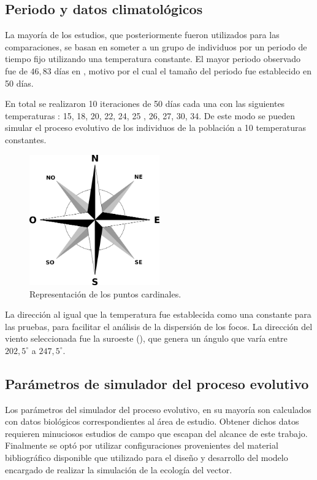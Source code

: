 \subsection{Periodo y datos climatológicos}
La mayoría de los estudios, que posteriormente fueron utilizados para las comparaciones, se basan
en someter a un grupo de individuos por un periodo de tiempo fijo utilizando una temperatura
constante. El mayor periodo observado fue de $46,83$ días en \cite{rueda1990temperature}, motivo
por el cual el tamaño del periodo fue establecido en 50 días.

En total se realizaron 10 iteraciones de 50 días cada una con las siguientes temperaturas :
15\textcelsius , 18\textcelsius , 20\textcelsius , 22\textcelsius , 24\textcelsius , 25\textcelsius
, 26\textcelsius , 27\textcelsius , 30\textcelsius , 34\textcelsius. De este modo se pueden simular
el proceso evolutivo de los individuos de la población a 10 temperaturas constantes.

\begin{figure}[!htpb]
\centering
\includegraphics[width=0.5\textwidth]{./capitulo-6/graphics/rosa-de-vientos.png}
\caption{\label{fig:puntos-cardinales}Representación de los puntos cardinales.}
\end{figure}

La dirección al igual que la temperatura fue establecida como una constante para las pruebas, para
facilitar el análisis de la dispersión de los focos. La dirección del viento seleccionada fue la
suroeste (), que genera un ángulo que varía entre $202,5^{\circ}$ a
$247,5^{\circ}$.

\subsection{Parámetros de simulador del proceso evolutivo}
Los parámetros del simulador del proceso evolutivo, en su mayoría son calculados con datos
biológicos correspondientes al área de estudio. Obtener dichos datos requieren minuciosos estudios
de campo que escapan del alcance de este trabajo. Finalmente se optó por utilizar configuraciones
provenientes del material bibliográfico disponible que utilizado para el diseño y desarrollo del
modelo encargado de realizar la simulación de la ecología del vector.

